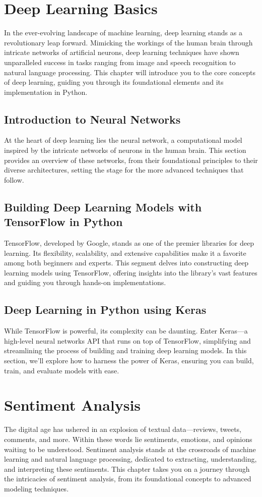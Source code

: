 \documentclass{book}
\begin{document}
\chapter{Deep Learning Basics}
In the ever-evolving landscape of machine learning, deep learning stands as a revolutionary leap forward. Mimicking the workings of the human brain through intricate networks of artificial neurons, deep learning techniques have shown unparalleled success in tasks ranging from image and speech recognition to natural language processing. This chapter will introduce you to the core concepts of deep learning, guiding you through its foundational elements and its implementation in Python.

\section{Introduction to Neural Networks}
At the heart of deep learning lies the neural network, a computational model inspired by the intricate networks of neurons in the human brain. This section provides an overview of these networks, from their foundational principles to their diverse architectures, setting the stage for the more advanced techniques that follow.

\section{Building Deep Learning Models with TensorFlow in Python}
TensorFlow, developed by Google, stands as one of the premier libraries for deep learning. Its flexibility, scalability, and extensive capabilities make it a favorite among both beginners and experts. This segment delves into constructing deep learning models using TensorFlow, offering insights into the library's vast features and guiding you through hands-on implementations.

\section{Deep Learning in Python using Keras}
While TensorFlow is powerful, its complexity can be daunting. Enter Keras—a high-level neural networks API that runs on top of TensorFlow, simplifying and streamlining the process of building and training deep learning models. In this section, we'll explore how to harness the power of Keras, ensuring you can build, train, and evaluate models with ease.

\chapter{Sentiment Analysis}
The digital age has ushered in an explosion of textual data—reviews, tweets, comments, and more. Within these words lie sentiments, emotions, and opinions waiting to be understood. Sentiment analysis stands at the crossroads of machine learning and natural language processing, dedicated to extracting, understanding, and interpreting these sentiments. This chapter takes you on a journey through the intricacies of sentiment analysis, from its foundational concepts to advanced modeling techniques.
\end{document}
